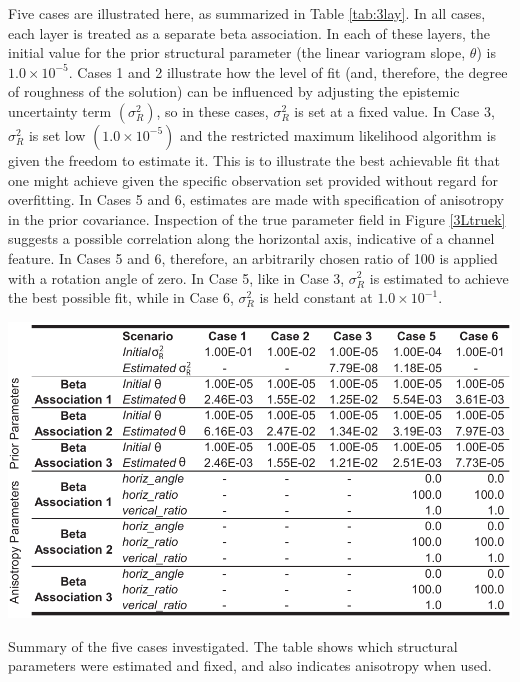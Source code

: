 \documentclass[11pt,oneside,onecolumn]{usgsreport}
\begin{document}
\begin{appendix}
Five cases are illustrated here, as summarized in Table \ref{tab:3lay}.
In all cases, each layer is treated as a separate beta association.
In each of these layers, the initial value for the prior structural
parameter (the linear variogram slope, $\theta$) is $1.0\times10^{-5}$.
Cases 1 and 2 illustrate how the level of fit (and, therefore, the
degree of roughness of the solution) can be influenced by adjusting
the epistemic uncertainty term $\left(\sigma_{R}^{2}\right)$, so
in these cases, $\sigma_{R}^{2}$ is set at a fixed value. In Case
3, $\sigma_{R}^{2}$ is set low $\left(1.0\times10^{-5}\right)$ and
the restricted maximum likelihood algorithm is given the freedom to
estimate it. This is to illustrate the best achievable fit that one
might achieve given the specific observation set provided without
regard for overfitting. In Cases 5 and 6, estimates are made with
specification of anisotropy in the prior covariance. Inspection of
the true parameter field in Figure \ref{3Ltruek} suggests a possible
correlation along the horizontal axis, indicative of a channel feature.
In Cases 5 and 6, therefore, an arbitrarily chosen ratio of 100 is
applied with a rotation angle of zero. In Case 5, like in Case 3,
$\sigma_{R}^{2}$ is estimated to achieve the best possible fit, while
in Case 6, $\sigma_{R}^{2}$ is held constant at $1.0\times10^{-1}.$

\begin{table}[!t]
\begin{center}\includegraphics[scale=0.9]{tables/3_layer_tables_for_structural_parameters}\end{center}

\caption{\label{tab:3lay}Summary of the five cases investigated. The table
shows which structural parameters were estimated and fixed, and also
indicates anisotropy when used. }



\end{table}
\end{appendix}
\end{document}
